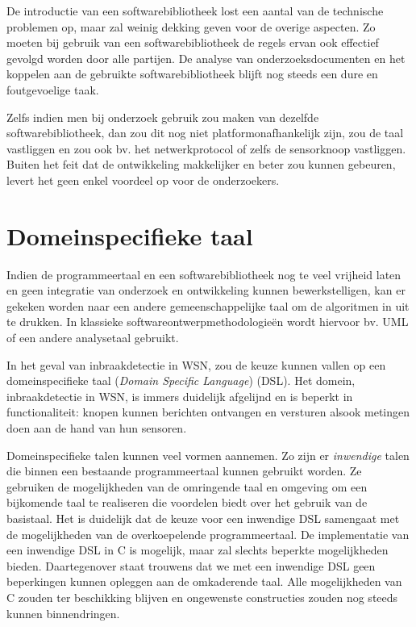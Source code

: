 De introductie van een softwarebibliotheek lost een aantal van de technische
problemen op, maar zal weinig dekking geven voor de overige aspecten. Zo moeten
bij gebruik van een softwarebibliotheek de regels ervan ook effectief gevolgd
worden door alle partijen. De analyse van onderzoeksdocumenten en het koppelen
aan de gebruikte softwarebibliotheek blijft nog steeds een dure en
foutgevoelige taak.

Zelfs indien men bij onderzoek gebruik zou maken van dezelfde
softwarebibliotheek, dan zou dit nog niet platformonafhankelijk zijn, zou de
taal vastliggen en zou ook bv. het netwerkprotocol of zelfs de sensorknoop
vastliggen. Buiten het feit dat de ontwikkeling makkelijker en beter zou kunnen
gebeuren, levert het geen enkel voordeel op voor de onderzoekers.

\vspace{-3mm}

\section{Domeinspecifieke taal}
\label{section:solution-dsl}

Indien de programmeertaal en een softwarebibliotheek nog te veel vrijheid laten
en geen integratie van onderzoek en ontwikkeling kunnen bewerkstelligen, kan er
gekeken worden naar een andere gemeenschappelijke taal om de algoritmen in uit
te drukken. In klassieke softwareontwerpmethodologie\"en wordt hiervoor bv. UML
\citep{url:uml} of een andere analysetaal gebruikt.

In het geval van inbraakdetectie in WSN, zou de keuze kunnen vallen op een
domeinspecifieke taal (\emph{Domain Specific Language})
(DSL)\citep{van2000domain, mernik2005and, fowler2010domain}. Het domein,
inbraakdetectie in WSN, is immers duidelijk afgelijnd en is beperkt in
functionaliteit: knopen kunnen berichten ontvangen en versturen alsook metingen
doen aan de hand van hun sensoren.

Domeinspecifieke talen kunnen veel vormen aannemen. Zo zijn er \emph{inwendige}
talen die binnen een bestaande programmeertaal kunnen gebruikt worden. Ze
gebruiken de mogelijkheden van de omringende taal en omgeving om een bijkomende
taal te realiseren die voordelen biedt over het gebruik van de basistaal. Het
is duidelijk dat de keuze voor een inwendige DSL samengaat met de mogelijkheden
van de overkoepelende programmeertaal. De implementatie van een inwendige DSL
in C is mogelijk, maar zal slechts beperkte mogelijkheden bieden. Daartegenover
staat trouwens dat we met een inwendige DSL geen beperkingen kunnen opleggen
aan de omkaderende taal. Alle mogelijkheden van C zouden ter beschikking
blijven en ongewenste constructies zouden nog steeds kunnen binnendringen.

